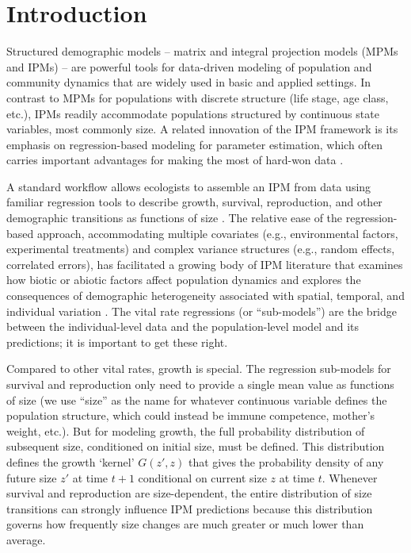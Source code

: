 \documentclass[12pt]{article}
\begin{document}
\newpage
\tableofcontents

\newpage
\section{Introduction}

Structured demographic models -- matrix and integral projection models (MPMs and IPMs) -- are powerful tools for data-driven modeling of population and community dynamics that are widely used in basic and applied settings. 
In contrast to MPMs for populations with discrete structure (life stage, age class, etc.), IPMs \citep{easterling2000size} readily accommodate populations structured by continuous state variables, most commonly size. 
A related innovation of the IPM framework is its emphasis on regression-based modeling for parameter estimation, which 
often carries important advantages for making the most of hard-won data \citep{ellner2022critical}.  

A standard workflow allows ecologists to assemble an IPM from data using familiar regression tools to describe growth, survival, reproduction, and other demographic transitions as functions of size \citep{Coulson:2012fk,ellner-etal-2016}. 
The relative ease of the regression-based approach, accommodating multiple covariates (e.g., environmental factors, experimental treatments) and complex variance structures (e.g., random effects, correlated errors), has facilitated a growing body of IPM literature that examines how biotic or abiotic factors affect population dynamics \citep[e.g.,][]{schultz2017native,ozgul2010coupled,louthan2022climate} and explores the consequences of demographic heterogeneity associated with spatial, temporal, and individual variation \citep[e.g.,][]{crone2016contrasting,compagnoni2016effect,plard2018sex}. 
The vital rate regressions (or ``sub-models'') are the bridge between the individual-level data and the population-level model and its predictions; it is important to get these right.

Compared to other vital rates, growth is special. 
The regression sub-models for survival and reproduction only need to provide a single mean value as functions of size (we use ``size'' as the name for whatever continuous variable defines the population structure, which could instead be immune competence, mother's weight, etc.).   
But for modeling growth, the full probability distribution of subsequent size, conditioned on initial size, must be defined. 
This distribution defines the growth `kernel' $G(z',z)$ that gives the probability density of any future size $z'$ at time $t+1$ conditional on current size $z$ at time $t$. 
Whenever survival and reproduction are size-dependent, the entire distribution of size transitions can strongly influence IPM predictions because this distribution governs how frequently size changes are much greater or much lower than average. 
\end{document}
